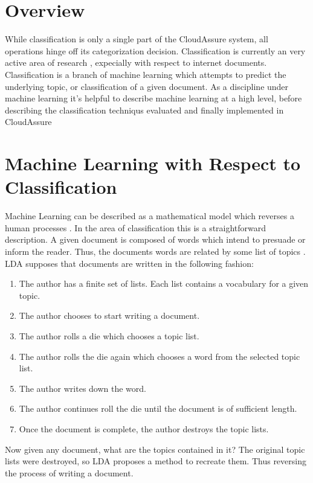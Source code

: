 \section{Overview}
While classification is only a single part of the CloudAssure system, all
operations hinge off its categorization decision. Classification is currently an
very active area of research \autocite{Zhang2000}, expecially with respect to
internet documents. Classification is a branch of machine learning which
attempts to predict the underlying topic, or classification of a given document.
As a discipline under machine learning it's helpful to describe machine learning
at a high level, before describing the classification techniqus evaluated and
finally implemented in CloudAssure

\section{Machine Learning with Respect to Classification}
Machine Learning can be described as a mathematical model which reverses a human
processes \autocite{Bishop2009}. In the area of classification this is
a straightforward description. A given document is composed of words which
intend to presuade or inform the reader. Thus, the documents words are related
by some list of topics \autocite{Blei2009}. \gls{LDA} supposes that documents are
written in the following fashion:
\begin{enumerate}
    \item The author has a finite set of lists. Each list contains a vocabulary
        for a given topic.
    \item The author chooses to start writing a document.
    \item The author rolls a die which chooses a topic list.
    \item The author rolls the die again which chooses a word from the selected
        topic list.
    \item The author writes down the word.
    \item The author continues roll the die until the document is of sufficient
        length.
    \item Once the document is complete, the author destroys the topic lists.
\end{enumerate}
Now given any document, what are the topics contained in it? The original topic
lists were destroyed, so \gls{LDA} proposes a method to recreate them. Thus reversing
the process of writing a document.

